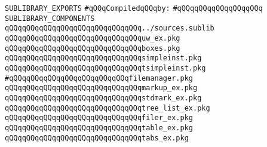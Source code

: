 \label{src/lib/tk/src/toolkit/tests+examples/sources.sublib}
\verb|SUBLIBRARY_EXPORTS|\newline
\newline
\verb|#qQQqCompiledqQQqby:|\newline
\verb|#qQQqqQQqqQQqqQQqqQQq|\newline
\newline
\verb|SUBLIBRARY_COMPONENTS|\newline
\newline
\verb|qQQqqQQqqQQqqQQqqQQqqQQqqQQqqQQq../sources.sublib|\newline
\newline
\verb|qQQqqQQqqQQqqQQqqQQqqQQqqQQqqQQquw_ex.pkg|\newline
\verb|qQQqqQQqqQQqqQQqqQQqqQQqqQQqqQQqboxes.pkg|\newline
\verb|qQQqqQQqqQQqqQQqqQQqqQQqqQQqqQQqsimpleinst.pkg|\newline
\verb|qQQqqQQqqQQqqQQqqQQqqQQqqQQqqQQqtsimpleinst.pkg|\newline
\verb|#qQQqqQQqqQQqqQQqqQQqqQQqqQQqfilemanager.pkg|\newline
\verb|qQQqqQQqqQQqqQQqqQQqqQQqqQQqqQQqmarkup_ex.pkg|\newline
\verb|qQQqqQQqqQQqqQQqqQQqqQQqqQQqqQQqstdmark_ex.pkg|\newline
\verb|qQQqqQQqqQQqqQQqqQQqqQQqqQQqqQQqtree_list_ex.pkg|\newline
\verb|qQQqqQQqqQQqqQQqqQQqqQQqqQQqqQQqfiler_ex.pkg|\newline
\verb|qQQqqQQqqQQqqQQqqQQqqQQqqQQqqQQqtable_ex.pkg|\newline
\verb|qQQqqQQqqQQqqQQqqQQqqQQqqQQqqQQqtabs_ex.pkg|\newline

